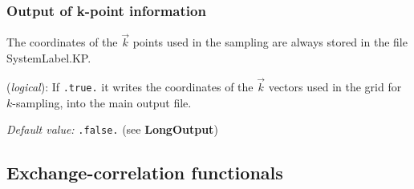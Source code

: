 \documentclass[11pt]{article}
\begin{document}
\subsubsection{Output of k-point information}

The coordinates of the $\vec k$ points used in the sampling
are always stored in the file SystemLabel.KP.

\begin{description}
\itemsep 10pt
\parsep 0pt
\item[{\bf WriteKpoints}] ({\it logical}):
If {\tt .true.} it writes the coordinates of the $\vec k$ vectors
used in the grid for $k$-sampling, into the main output file.

{\it Default value:} {\tt .false.} (see {\bf LongOutput})

\end{description}

\vspace{5pt}
\subsection{Exchange-correlation functionals}
\end{document}
